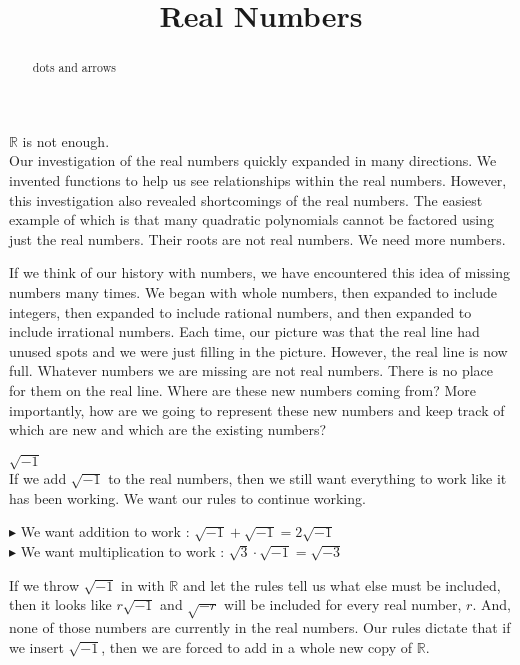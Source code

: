 \documentclass{ximera}
\title{Real Numbers}
\begin{document}
\begin{abstract}
dots and arrows
\end{abstract}
\maketitle



\textbf{$\mathbb{R}$} is not enough.  \\



Our investigation of the real numbers quickly expanded in many directions. We invented functions to help us see relationships within the real numbers.  However, this investigation also revealed shortcomings of the real numbers. The easiest example of which is that many quadratic polynomials cannot be factored using just the real numbers. Their roots are not real numbers. We need more numbers.


If we think of our history with numbers, we have encountered this idea of missing numbers many times.  We began with whole numbers, then expanded to include integers, then expanded to include rational numbers, and then expanded to include irrational numbers.  Each time, our picture was that the real line had unused spots and we were just filling in the picture.  However, the real line is now full. Whatever numbers we are missing are not real numbers.  There is no place for them on the real line.  Where are these new numbers coming from? More importantly, how are we going to represent these new numbers and keep track of which are new and which are the existing numbers?


\begin{idea} \textbf{\textcolor{purple!85!blue}{$\sqrt{-1}$}} \\


If we add $\sqrt{-1}$ to the real numbers, then we still want everything to work like it has been working.  We want our rules to continue working.


$\blacktriangleright$ We want addition to work : $\sqrt{-1} + \sqrt{-1} = 2\sqrt{-1}$ \\

$\blacktriangleright$ We want multiplication to work : $\sqrt{3} \cdot \sqrt{-1} = \sqrt{-3}$ \\


\end{idea}


If we throw $\sqrt{-1}$ in with $\mathbb{R}$ and let the rules tell us what else must be included, then it looks like $r\sqrt{-1}$ and $\sqrt{-r}$ will be included for every real number, $r$.  And, none of those numbers are currently in the real numbers. Our rules dictate that if we insert $\sqrt{-1}$, then we are forced to add in a whole new copy of $\mathbb{R}$.
\end{document}
